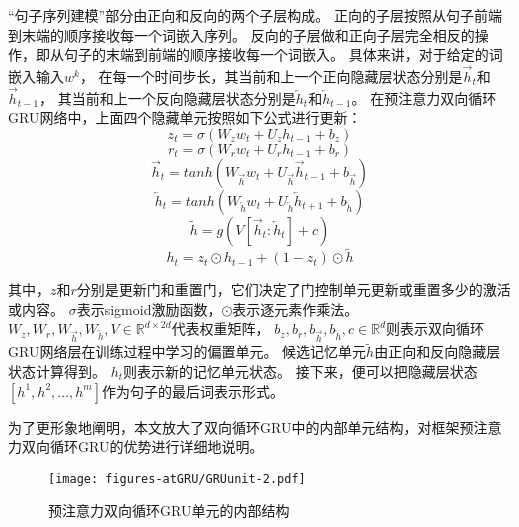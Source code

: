 “句子序列建模”部分由正向和反向的两个子层构成。
正向的子层按照从句子前端到末端的顺序接收每一个词嵌入序列。
反向的子层做和正向子层完全相反的操作，即从句子的末端到前端的顺序接收每一个词嵌入。
具体来讲，对于给定的词嵌入输入${w^k}$，
在每一个时间步长，其当前和上一个正向隐藏层状态分别是${\overrightarrow{h}_{t}}$和${\overrightarrow{h}_{t-1}}$，
其当前和上一个反向隐藏层状态分别是${\overleftarrow{h}_{t}}$和${\overleftarrow{h}_{t-1}}$。
在预注意力双向循环GRU网络中，上面四个隐藏单元按照如下公式进行更新：
\begin{equation}
    z_{t}=\sigma\left(W_{z}w_{t}+U_{z}h_{t-1}+b_{z}\right)
\end{equation}
\begin{equation}
    r_{t}=\sigma\left(W_{r}w_{t}+U_{r}h_{t-1}+b_{r}\right)
\end{equation}
\begin{equation}
    \overrightarrow{h}_{t}=tanh\left(W_{\overrightarrow{h}}w_{t}+ U_{\overrightarrow{h}}\overrightarrow{h}_{t-1}+b_{\overrightarrow{h}}\right)
\end{equation}
\begin{equation}
    \overleftarrow{h}_{t}=tanh\left(W_{\overleftarrow{h}}w_{t}+ U_{\overleftarrow{h}}\overleftarrow{h}_{t+1}+b_{\overleftarrow{h}}\right)
\end{equation}
\begin{equation}
    \widetilde{h}=g\left(V\left[\overrightarrow{h}_{t}:\overleftarrow{h}_{t}\right]+c\right)
    \label{eq:vc}
\end{equation}
\begin{equation}
    h_{t}=z_{t}\odot h_{t-1}+\left(1-z_{t}\right)\odot\widetilde{h}
\end{equation}

其中，${z}$和${r}$分别是更新门和重置门，它们决定了门控制单元更新或重置多少的激活或内容。
${\sigma}$表示sigmoid激励函数，${\odot}$表示逐元素作乘法。
${W_{z},W_{r},W_{\overrightarrow{h}},W_{\overleftarrow{h}},V \in \mathbb{R}^{d\times2d}}$代表权重矩阵，
${b_{z},b_{r},b_{\overrightarrow{h}},b_{\overleftarrow{h}},c \in \mathbb{R}^{d}}$则表示双向循环GRU网络层在训练过程中学习的偏置单元。
候选记忆单元${\widetilde{h}}$由正向和反向隐藏层状态计算得到。
${h_{t}}$则表示新的记忆单元状态。
接下来，便可以把隐藏层状态${\left[h^{1},h^{2},\dots,h^{m}\right]}$作为句子的最后词表示形式。

为了更形象地阐明，本文放大了双向循环GRU中的内部单元结构，对框架预注意力双向循环GRU的优势进行详细地说明。
\begin{figure}[h!]
    \centering
    \texttt{[image: figures-atGRU/GRUunit-2.pdf]}
    \caption{预注意力双向循环GRU单元的内部结构}
    \label{fig:GRUunit-2}
\end{figure}

